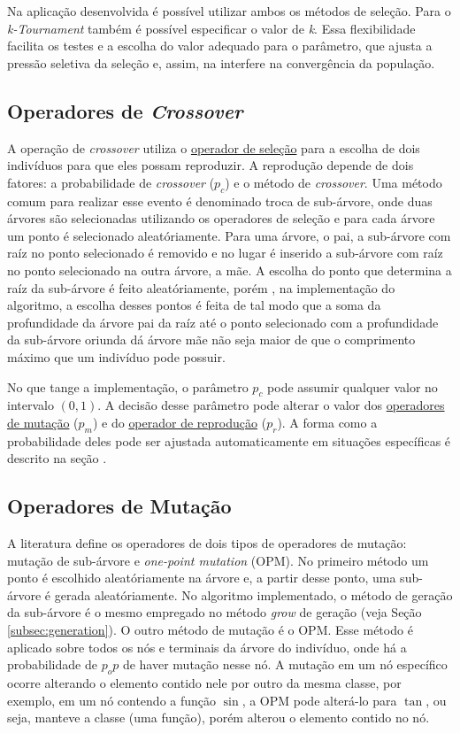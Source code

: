 \documentclass[a4paper]{paper}
\begin{document}
Na aplicação desenvolvida é possível utilizar ambos os métodos de seleção. Para
o \textit{k-Tournament} também é possível especificar o valor de \textit{k}.
Essa flexibilidade facilita os testes e a escolha do valor adequado para o
parâmetro, que ajusta a pressão seletiva da seleção e, assim, na interfere na
convergência da população.

\subsection{Operadores de \textit{Crossover}} \label{subsec:crossover}

A operação de \textit{crossover} utiliza o \hyperref[subsec:selection]{operador
  de seleção} para a escolha de dois indivíduos para que eles possam
reproduzir. A reprodução depende de dois fatores: a probabilidade de
\textit{crossover} ($p_c$) e o método de \textit{crossover}.  Uma método comum
para realizar esse evento é denominado troca de sub-árvore, onde duas árvores
são selecionadas utilizando os operadores de seleção e para cada árvore um ponto
é selecionado aleatóriamente. Para uma árvore, o pai, a sub-árvore com raíz no
ponto selecionado é removido e no lugar é inserido a sub-árvore com raíz no
ponto selecionado na outra árvore, a mãe. A escolha do ponto que determina a
raíz da sub-árvore é feito aleatóriamente, porém , na implementação do
algoritmo, a escolha desses pontos é feita de tal modo que a soma da
profundidade da árvore pai da raíz até o ponto selecionado com a profundidade da
sub-árvore oriunda dá árvore mãe não seja maior de que o comprimento máximo que
um indivíduo pode possuir.

No que tange a implementação, o parâmetro $p_c$ pode assumir qualquer valor no
intervalo $(0, 1)$. A decisão desse parâmetro pode alterar o valor dos
\hyperref[subsec:mutation]{operadores de mutação} ($p_m$) e do
\hyperref[subsec:reproduction]{operador de reprodução} ($p_r$). A forma como a
probabilidade deles pode ser ajustada automaticamente em situações específicas é
descrito na seção .

\subsection{Operadores de Mutação} \label{subsec:mutation}

A literatura define os operadores de dois tipos de operadores de mutação:
mutação de sub-árvore e \textit{one-point mutation} (OPM). No primeiro método um
ponto é escolhido aleatóriamente na árvore e, a partir desse ponto, uma
sub-árvore é gerada aleatóriamente. No algoritmo implementado, o método de
geração da sub-árvore é o mesmo empregado no método \textit{grow} de geração
(veja Seção \ref{subsec:generation}). O outro método de mutação é o OPM. Esse
método é aplicado sobre todos os nós e terminais da árvore do indivíduo, onde há
a probabilidade de $p_op$ de haver mutação nesse nó. A mutação em um nó
específico ocorre alterando o elemento contido nele por outro da mesma classe,
por exemplo, em um nó contendo a função $\sin$, a OPM pode alterá-lo para
$\tan$, ou seja, manteve a classe (uma função), porém alterou o elemento contido
no nó.
\end{document}

